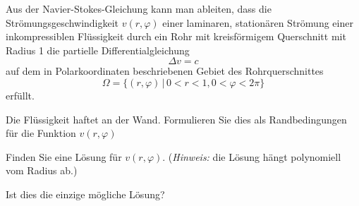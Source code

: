 Aus der Navier-Stokes-Gleichung kann man ableiten, dass die
Strömungsgeschwindigkeit $v(r,\varphi)$ einer laminaren,
stationären Strömung einer inkompressiblen Flüssigkeit
durch ein Rohr mit kreisförmigem Querschnitt mit Radius 1
die partielle Differentialgleichung
\[
\Delta v=c
\]
auf dem in Polarkoordinaten beschriebenen Gebiet des Rohrquerschnittes
\[
\Omega = \{ (r,\varphi)\,|\,0 < r < 1,0 < \varphi < 2\pi\}
\]
erfüllt.
\begin{teilaufgaben}
\item Die Flüssigkeit haftet an der Wand. Formulieren Sie dies
als Randbedingungen für die Funktion $v(r,\varphi)$
\item Finden Sie eine Lösung für $v(r,\varphi)$. ({\it Hinweis:}
die Lösung hängt polynomiell vom Radius ab.)
\item Ist dies die einzige mögliche Lösung?
\end{teilaufgaben}

